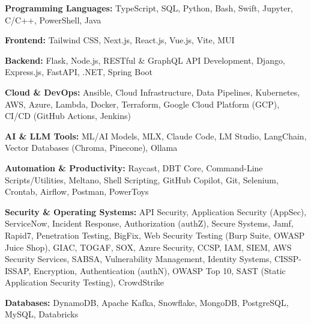 \textbf{Programming Languages:} TypeScript, SQL, Python, Bash, Swift, Jupyter, C/C++, PowerShell, Java
\vspace{3pt}

\textbf{Frontend:} Tailwind CSS, Next.js, React.js, Vue.js, Vite, MUI
\vspace{3pt}

\textbf{Backend:} Flask, Node.js, RESTful \& GraphQL API Development, Django, Express.js, FastAPI, .NET, Spring Boot
\vspace{3pt}

\textbf{Cloud \& DevOps:} Ansible, Cloud Infrastructure, Data Pipelines, Kubernetes, AWS, Azure, Lambda, Docker, Terraform, Google Cloud Platform (GCP), CI/CD (GitHub Actions, Jenkins)
\vspace{3pt}

\textbf{AI \& LLM Tools:} ML/AI Models, MLX, Claude Code, LM Studio, LangChain, Vector Databases (Chroma, Pinecone), Ollama
\vspace{3pt}

\textbf{Automation \& Productivity:} Raycast, DBT Core, Command-Line Scripts/Utilities, Meltano, Shell Scripting, GitHub Copilot, Git, Selenium, Crontab, Airflow, Postman, PowerToys
\vspace{3pt}

\textbf{Security \& Operating Systems:} API Security, Application Security (AppSec), ServiceNow, Incident Response, Authorization (authZ), Secure Systems, Jamf, Rapid7, Penetration Testing, BigFix, Web Security Testing (Burp Suite, OWASP Juice Shop), GIAC, TOGAF, SOX, Azure Security, CCSP, IAM, SIEM, AWS Security Services, SABSA, Vulnerability Management, Identity Systems, CISSP-ISSAP, Encryption, Authentication (authN), OWASP Top 10, SAST (Static Application Security Testing), CrowdStrike
\vspace{3pt}

\textbf{Databases:} DynamoDB, Apache Kafka, Snowflake, MongoDB, PostgreSQL, MySQL, Databricks